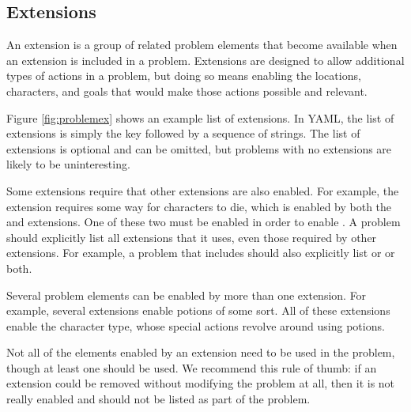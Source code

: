 \documentclass{nilreport}
\begin{document}
\newpage

\subsection{Extensions} \label{sec:extensions}

An extension is a group of related problem elements that become available when an extension is included in a problem. Extensions are designed to allow additional types of actions in a problem, but doing so means enabling the locations, characters, and goals that would make those actions possible and relevant.

Figure \ref{fig:problemex} shows an example list of extensions. In YAML, the list of extensions is simply the key  followed by a sequence of strings. The list of extensions is optional and can be omitted, but problems with no extensions are likely to be uninteresting.

Some extensions require that other extensions are also enabled. For example, the  extension requires some way for characters to die, which is enabled by both the  and  extensions. One of these two must be enabled in order to enable . A problem should explicitly list all extensions that it uses, even those required by other extensions. For example, a problem that includes  should also explicitly list  or  or both.

Several problem elements can be enabled by more than one extension. For example, several extensions enable potions of some sort. All of these extensions enable the  character type, whose special actions revolve around using potions.

Not all of the elements enabled by an extension need to be used in the problem, though at least one should be used. We recommend this rule of thumb: if an extension could be removed without modifying the problem at all, then it is not really enabled and should not be listed as part of the problem.

\end{document}
